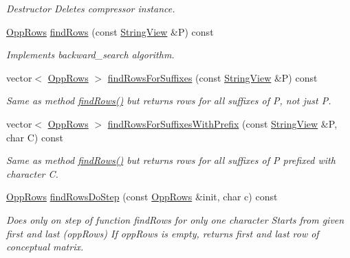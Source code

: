 \begin{DoxyCompactItemize}
\begin{DoxyCompactList}\small\item\em \-Destructor \-Deletes compressor instance. \end{DoxyCompactList}\item 
\hyperlink{class_opp_rows}{\-Opp\-Rows} \hyperlink{class_opp_ad832848ca2af3d126e289df1f8e1c65d}{find\-Rows} (const \hyperlink{class_string_view}{\-String\-View} \&\-P) const 
\begin{DoxyCompactList}\small\item\em \-Implements backward\-\_\-search algorithm. \end{DoxyCompactList}\item 
vector$<$ \hyperlink{class_opp_rows}{\-Opp\-Rows} $>$ \hyperlink{class_opp_abf6d666966131f2dd737ac6ff6c1ea0e}{find\-Rows\-For\-Suffixes} (const \hyperlink{class_string_view}{\-String\-View} \&\-P) const 
\begin{DoxyCompactList}\small\item\em \-Same as method \hyperlink{class_opp_ad832848ca2af3d126e289df1f8e1c65d}{find\-Rows()} but returns rows for all suffixes of \-P, not just \-P. \end{DoxyCompactList}\item 
vector$<$ \hyperlink{class_opp_rows}{\-Opp\-Rows} $>$ \hyperlink{class_opp_a0ddbf31bae4785ee68551c389ffd7a19}{find\-Rows\-For\-Suffixes\-With\-Prefix} (const \hyperlink{class_string_view}{\-String\-View} \&\-P, char \-C) const 
\begin{DoxyCompactList}\small\item\em \-Same as method \hyperlink{class_opp_ad832848ca2af3d126e289df1f8e1c65d}{find\-Rows()} but returns rows for all suffixes of \-P prefixed with character \-C. \end{DoxyCompactList}\item 
\hyperlink{class_opp_rows}{\-Opp\-Rows} \hyperlink{class_opp_a04b122b2ad82ac260733aa9ad7751234}{find\-Rows\-Do\-Step} (const \hyperlink{class_opp_rows}{\-Opp\-Rows} \&init, char c) const 
\begin{DoxyCompactList}\small\item\em \-Does only on step of function find\-Rows for only one character \-Starts from given first and last (opp\-Rows) \-If opp\-Rows is empty, returns first and last row of conceptual matrix. \end{DoxyCompactList}\end{DoxyCompactItemize}


